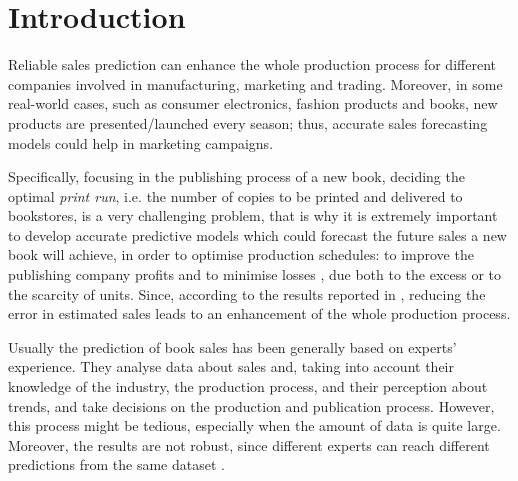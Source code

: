 \documentclass[a4paper,10pt,onecolumn,preprint,3p]{elsarticle}
\begin{document}
\section{Introduction}
\label{sec:intro}


Reliable sales prediction can enhance the whole production process for different 
companies involved in manufacturing, marketing and trading.
Moreover, in some real-world cases, such as consumer electronics, fashion products and books,
new products are presented/launched every season; thus, accurate sales forecasting 
models could help in marketing campaigns.

Specifically, focusing in the publishing process of a new book, deciding the optimal {\em
  print run}, i.e. the number of copies to be printed and delivered to
bookstores, is a very challenging problem, that is why it is extremely
important to develop accurate predictive models which could forecast
the future sales a new book will achieve, in order to optimise
production schedules: to improve the publishing company profits and to
minimise losses \cite{Zhao2001}, due both to the excess or to the
scarcity of units. 
Since, according to the results reported in \cite{Fildes2010,Saeed2008}, reducing the error in estimated sales leads to an enhancement of the whole production process.

Usually the prediction of book sales has been generally based on experts' experience. They analyse data about sales and, taking into account their knowledge of the industry, the production process, and their perception about trends, and take decisions on the production and publication process.
However, this process might be tedious, especially when the amount of data is 
quite large. Moreover, the results are not robust, since different experts can reach different predictions from the same dataset \cite{Sanders1994}.
\end{document}
